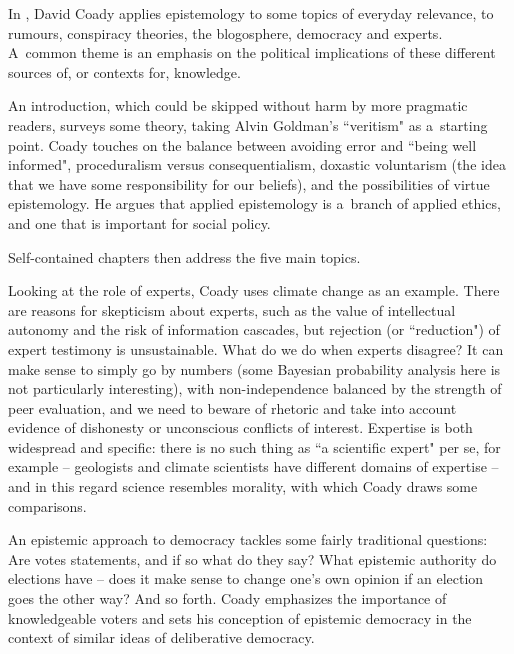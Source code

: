 \newpage\nuluj
\pagestyle{coady}


In , David Coady applies epistemology to some topics of everyday relevance, to rumours, conspiracy theories, the blogosphere, democracy and experts. A~common theme is an emphasis on the political implications of these different sources of, or contexts for, knowledge. 

An introduction, which could be skipped without harm by more pragmatic readers, surveys some theory, taking Alvin Goldman's ``veritism" as a~starting point. Coady touches on the balance between avoiding error and ``being well informed", proceduralism versus consequentialism, doxastic voluntarism (the idea that we have some responsibility for our beliefs), and the possibilities of virtue epistemology. He argues that applied epistemology is a~branch of applied ethics, and one that is important for social policy. 

Self-contained chapters then address the five main topics.

Looking at the role of experts, Coady uses climate change as an example. There are reasons for skepticism about experts, such as the value of intellectual autonomy and the risk of information cascades, but rejection (or ``reduction") of expert testimony is unsustainable. What do we do when experts disagree? It can make sense to simply go by numbers (some Bayesian probability analysis here is not particularly interesting), with non-independence balanced by the strength of peer evaluation, and we need to beware of rhetoric and take into account evidence of dishonesty or unconscious conflicts of interest. Expertise is both widespread and specific: there is no such thing as ``a scientific expert" per se, for example -- geologists and climate scientists have different domains of expertise -- and in this regard science resembles morality, with which Coady draws some comparisons. 

An epistemic approach to democracy tackles some fairly traditional questions: Are votes statements, and if so what do they say? What epistemic authority do elections have -- does it make sense to change one's own opinion if an election goes the other way? And so forth. Coady emphasizes the importance of knowledgeable voters and sets his conception of epistemic democracy in the context of similar ideas of deliberative democracy. 

